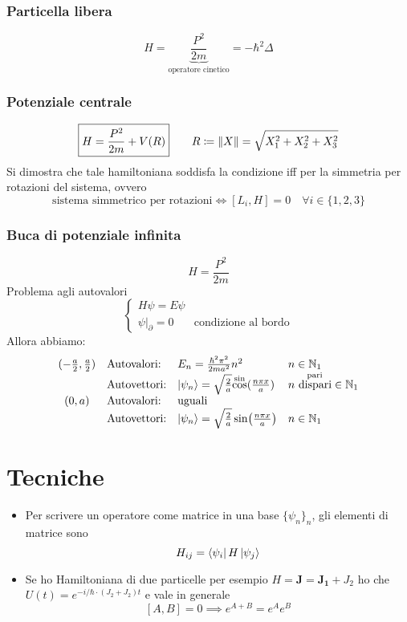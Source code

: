 \documentclass[a4paper,10pt]{article}
\theoremstyle{definition}
\newcommand{\bv}{\boldsymbol} %
\newcommand{\na}{\mathbb{N}} %
\theoremstyle{indentdefinition}
\theoremstyle{indenttheorem}
\theoremstyle{myremark}
\theoremstyle{indentgeneral}
\begin{document}
\section{Particella libera}
$$H=\underbrace{\frac{P^2}{2m}}_{\text{operatore cinetico}}=-\hbar^2\Delta$$
\section{Potenziale centrale}
$$\boxed{H=\frac{P^2}{2m}+V(R)}\qquad R\coloneqq \norm{X}=\sqrt{X_1^2+X_2^2+X_3^2}$$
Si dimostra che tale hamiltoniana soddisfa la condizione iff per la simmetria per rotazioni del sistema, ovvero
$$\text{sistema simmetrico per rotazioni}\iff \left[L_i,H\right]=0\quad \forall i\in \{1,2,3\}$$
\section{Buca di potenziale infinita} 
$$H=\frac{P^2}{2m}$$
Problema agli autovalori
$$\begin{cases}
    H\psi=E\psi\\
    \psi|_\partial=0 & \text{condizione al bordo}
\end{cases}$$
Allora abbiamo:
$$\begin{array}{clll}
     (-\frac{a}{2},\frac{a}{2}) &  \text{Autovalori:} & E_n=\frac{\hbar^2\pi^2}{2ma^2}n^2 & n\in\na_1 \\
   & \text{Autovettori:} & \ket{\psi_n}=\sqrt{\frac{2}{a}}\overset{\sin}{\cos}(\frac{n\pi x}{a}) & n \overset{\text{ pari}}{\text{ dispari}}\in \na_1\\
    (0,a) &   \text{Autovalori:} & \text{uguali} &\\
   & \text{Autovettori:} & \ket{\psi_n}=\sqrt{\frac{2}{a}}\sin(\frac{n\pi x}{a}) & n \in \na_1\\
\end{array}$$

\pagebreak
\part{Tecniche}
\begin{itemize}
    \item Per scrivere un operatore come matrice in una base $\{\psi_n\}_n$, gli elementi di matrice sono
    $$H_{ij}=\bra{\psi_i}H\ket{\psi_j}$$
    \item Se ho Hamiltoniana di due particelle per esempio $H=\bv{J}=\bv{J_1}+J_2$ ho che $U(t)=e^{-i/\hbar\cdot (J_2+J_2)t}$ e vale in generale
    $$[A,B]=0\implies e^{A+B}=e^Ae^B$$
\end{itemize}
\end{document}
